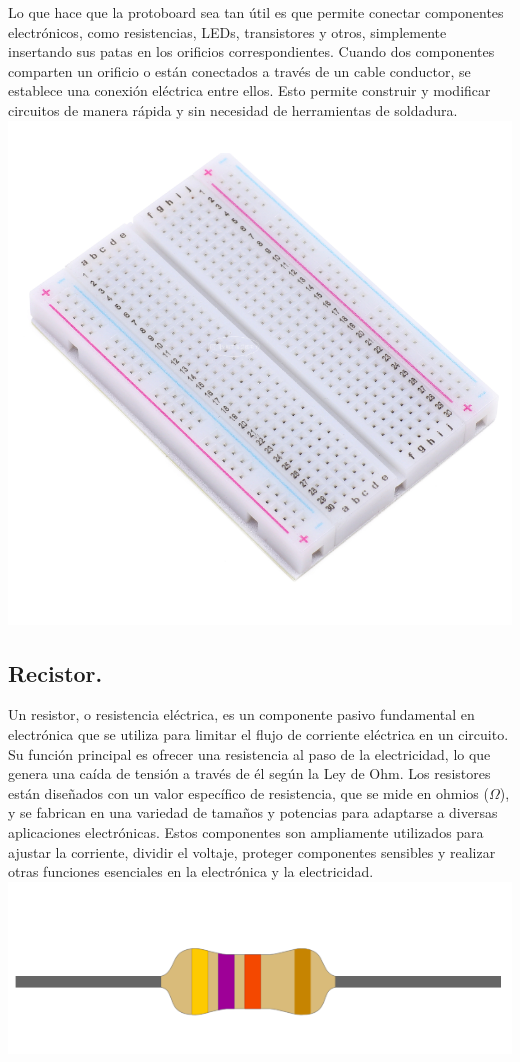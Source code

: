 \documentclass[10pt]{article}
\begin{document}
\begin{multicols}{2}
Lo que hace que la protoboard sea tan útil es que permite conectar componentes electrónicos, como resistencias, LEDs, transistores y otros, simplemente insertando sus patas en los orificios correspondientes. Cuando dos componentes comparten un orificio o están conectados a través de un cable conductor, se establece una conexión eléctrica entre ellos. Esto permite construir y modificar circuitos de manera rápida y sin necesidad de herramientas de soldadura.
\includegraphics[width=\linewidth]{Imagenes/proto1.jpg}
\subsection{Recistor.}
Un resistor, o resistencia eléctrica, es un componente pasivo fundamental en electrónica que se utiliza para limitar el flujo de corriente eléctrica en un circuito. Su función principal es ofrecer una resistencia al paso de la electricidad, lo que genera una caída de tensión a través de él según la Ley de Ohm. Los resistores están diseñados con un valor específico de resistencia, que se mide en ohmios ($\Omega$), y se fabrican en una variedad de tamaños y potencias para adaptarse a diversas aplicaciones electrónicas. Estos componentes son ampliamente utilizados para ajustar la corriente, dividir el voltaje, proteger componentes sensibles y realizar otras funciones esenciales en la electrónica y la electricidad.
\includegraphics[width=\linewidth]{Imagenes/resistor.png}

\end{multicols}
\end{document}
